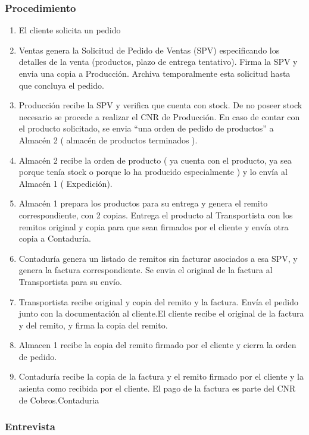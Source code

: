 \subsubsection{Procedimiento}
\begin{enumerate}
\item El cliente solicita un pedido
\item Ventas genera la Solicitud de Pedido de Ventas (SPV) especificando los detalles de la venta (productos, plazo de entrega tentativo).
	Firma la SPV y envia una copia a Producci\'on. Archiva temporalmente esta solicitud hasta que concluya el pedido.
\item Producci\'on recibe la SPV y verifica que cuenta con stock. De no poseer stock necesario se procede a realizar el CNR de Producci\'on. 
	En caso de contar con el producto solicitado, se envia ``una orden de pedido de productos'' a Almac\'en 2 ( almacén de productos terminados ).
\item Almac\'en 2 recibe la orden de producto ( ya cuenta con el producto, ya sea porque ten\'ia stock o porque lo ha producido especialmente ) y lo env\'ia al  Almac\'en 1 ( Expedici\'on).
\item Almac\'en 1 prepara los productos para su entrega y genera el remito correspondiente, con 2 copias. Entrega el producto al Transportista con los remitos original y copia para que sean firmados por el cliente y env\'ia otra copia a Contadur\'ia.
\item Contadur\'ia genera un listado de remitos sin facturar asociados a esa SPV, y genera la factura correspondiente. Se envia el original de la factura al Transportista para su env\'io.
\item Transportista recibe original y copia del remito y la factura. Env\'ia el pedido junto con la documentaci\'on al cliente.El cliente recibe el original de la factura y del remito, y firma la copia del remito.
\item Almacen 1 recibe la copia del remito firmado por el cliente y cierra la orden de pedido. 
\item Contadur\'ia recibe la copia de la factura y el remito firmado por el cliente y la asienta como recibida por el cliente. El pago de la factura es parte del CNR de Cobros.Contaduria
\end{enumerate}

\subsubsection{Entrevista}

